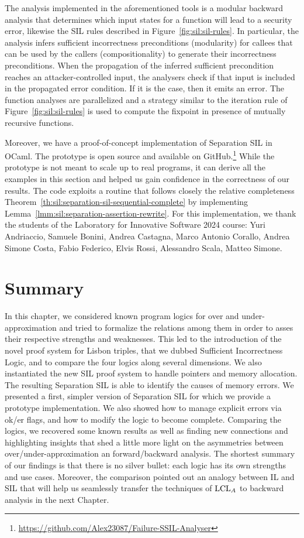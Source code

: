 The analysis implemented in the aforementioned tools is a modular backward analysis that determines which input states for a function will lead to a security error, likewise the SIL rules described in Figure~\ref{fig:sil:sil-rules}.
In particular, the analysis infers sufficient incorrectness preconditions (modularity) for callees that can be used by the callers (compositionality) to generate their incorrectness preconditions.
When the propagation of the inferred sufficient precondition reaches an attacker\hyp{}controlled input, the analysers check if that input is included in the propagated error condition.
If it is the case, then it emits an error.
The function analyses are parallelized and a strategy similar to the iteration rule of Figure~\ref{fig:sil:sil-rules} is used to compute the fixpoint in presence of mutually recursive functions.

Moreover, we have a proof-of-concept implementation of Separation SIL in OCaml. The prototype is open source and available on GitHub.\footnote{\url{https://github.com/Alex23087/Failure-SSIL-Analyser}} While the prototype is not meant to scale up to real programs, it can derive all the examples in this section and helped us gain confidence in the correctness of our results. The code exploits a routine that follows closely the relative completeness Theorem~\ref{th:sil:separation-sil-sequential-complete} by implementing Lemma~\ref{lmm:sil:separation-assertion-rewrite}.
For this implementation, we thank the students of the Laboratory for Innovative Software 2024 course: Yuri Andriaccio, Samuele Bonini, Andrea Castagna, Marco Antonio Corallo, Andrea Simone Costa, Fabio Federico, Elvis Rossi, Alessandro Scala, Matteo Simone.

\section{Summary}
In this chapter, we considered known program logics for over and under-approximation and tried to formalize the relations among them in order to asses their respective strengths and weaknesses. This led to the introduction of the novel proof system for Lisbon triples, that we dubbed Sufficient Incorrectness Logic, and to compare the four logics along several dimensions.
We also instantiated the new SIL proof system to handle pointers and memory allocation. The resulting Separation SIL is able to identify the causes of memory errors. We presented a first, simpler version of Separation SIL for which we provide a prototype implementation. We also showed how to manage explicit errors via ok/er flags, and how to modify the logic to become complete.
Comparing the logics, we recovered some known results as well as finding new connections and highlighting insights that shed a little more light on the asymmetries between over/under-approximation an forward/backward analysis. The shortest summary of our findings is that there is no silver bullet: each logic has its own strengths and use cases. Moreover, the comparison pointed out an analogy between IL and SIL that will help us seamlessly transfer the techniques of $\text{LCL}_A$ to backward analysis in the next Chapter.
